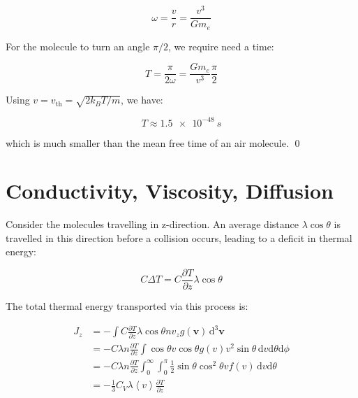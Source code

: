 \documentclass[12pt]{article}
\begin{document}
\begin{equation}
    \omega = \frac{v}{r} = \frac{v^{3}}{Gm_{e}}
\end{equation}

For the molecule to turn an angle $\pi/2$, we require need a time:

\begin{equation}
    T = \frac{\pi}{2\omega} = \frac{Gm_{e}}{v^{3}} \frac{\pi}{2}
\end{equation}

Using $v = v_{\text{th}} = \sqrt{2k_{B}T/m}$, we have:

\begin{equation}
    T \approx \qty{1.5e-48}{s}
\end{equation}

which is much smaller than the mean free time of an air molecule.
\qed


\pagebreak
\section*{Conductivity, Viscosity, Diffusion}


Consider the molecules travelling in z-direction. An average distance $\lambda\cos{\theta}$ is travelled in this direction before a collision occurs, leading to a deficit in thermal energy:

\begin{equation}
    C \Delta T = C \frac{\partial T}{\partial z} \lambda \cos{\theta}
\end{equation}

The total thermal energy transported via this process is:

\begin{equation}
\begin{split}
    J_{z} &= -\int C \frac{\partial T}{\partial z} \lambda \cos{\theta} n v_{z} g(\mathbf{v}) \, \mathrm{d}^{3} \mathbf{v} \\
    &= -C \lambda n \frac{\partial T}{\partial z} \int \cos{\theta} v \cos{\theta} g(v) v^{2} \sin{\theta} \, \mathrm{d}v \mathrm{d}\theta \mathrm{d}\phi \\
    &= -C \lambda n \frac{\partial T}{\partial z} \int_{0}^{\infty} \int_{0}^{\pi} \frac{1}{2} \sin{\theta} \cos^{2}{\theta} v f(v) \, \mathrm{d}v \mathrm{d}\theta \\
    &= -\frac{1}{3} C_{V} \lambda \left\langle v \right\rangle \frac{\partial T}{\partial z} 
\end{split}
\end{equation}
\end{document}
